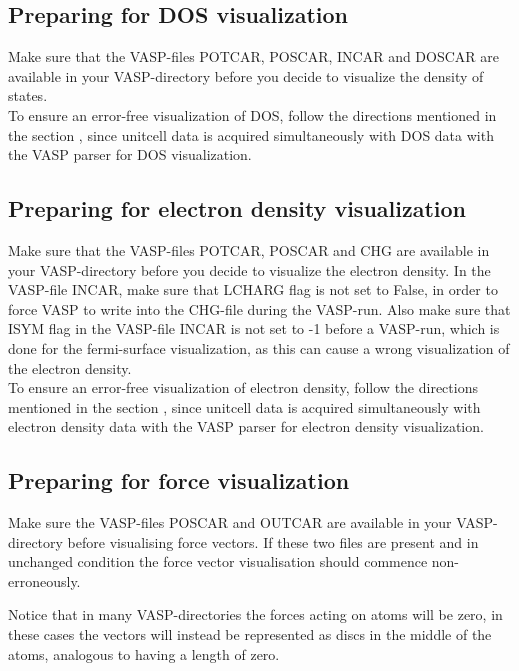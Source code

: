\subsection{Preparing for DOS visualization}

Make sure that the VASP-files POTCAR, POSCAR, INCAR and DOSCAR are available in your VASP-directory before you decide to visualize the density of states. \\

To ensure an error-free visualization of DOS, follow the directions mentioned in the section \emph{}, since unitcell data is acquired simultaneously with DOS data with the VASP parser for DOS visualization.

\subsection{Preparing for electron density visualization}

Make sure that the VASP-files POTCAR, POSCAR and CHG are available in your VASP-directory before you decide to visualize the electron density. In the VASP-file INCAR, make sure that LCHARG flag is not set to False, in order to force VASP to write into the CHG-file during the VASP-run. Also make sure that ISYM flag in the VASP-file INCAR is not set to -1 before a VASP-run, which is done for the fermi-surface visualization, as this can cause a wrong visualization of the electron density.\\

To ensure an error-free visualization of electron density, follow the directions mentioned in the section \emph{}, since unitcell data is acquired simultaneously with electron density data with the VASP parser for electron density visualization.

\subsection{Preparing for force visualization}
Make sure the VASP-files POSCAR and OUTCAR are available in your VASP-directory before visualising force vectors. If these two files are present and in unchanged condition the force vector visualisation should commence non-erroneously.

Notice that in many VASP-directories the forces acting on atoms will be zero, in these cases the vectors will instead be represented as discs in the middle of the atoms, analogous to having a length of zero.

